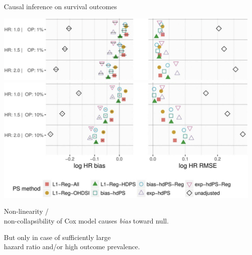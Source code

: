 \documentclass[aspectratio=169,xcolor=dvipsnames]{beamer}					%
\begin{document}
{
\begin{frame}{Causal inference on survival outcomes}
	\hspace*{.03\linewidth}
	\begin{minipage}{.7\linewidth}
	\includegraphics[width=\linewidth]{figures/positive_control_experiments_1_percent_outcome}
	\includegraphics[width=\linewidth]{figures/positive_control_experiments_10_percent_outcome}
	\end{minipage}
	\nobreak\hspace{.15em}
	\begin{minipage}{.24\linewidth}
	Non-linearity / \\ non-collapsibility of Cox model causes \emph{bias} toward null.
	
	\pause
	\vspace*{\baselineskip}
	But only in case of sufficiently large\\ hazard ratio and/or high outcome prevalence.
	\end{minipage}
\end{frame}
}
\end{document}

